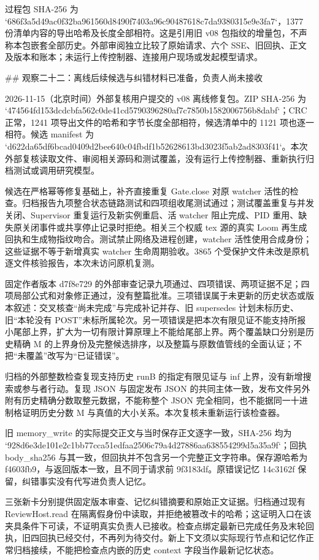 过程包 SHA-256 为 `686f3a5d49ac0f32ba961560d8490f7403a96c90487618c7da9380315e9e3fa7`，1377 份清单内容的导出哈希及长度全部相符。这是引用旧 v08 包指纹的增量包，不声称本包嵌套全部历史。外部审阅独立比较了原始请求、六个 SSE、旧回执、正文及版本和账本；未运行上传控制器、连接用户现场或发起模型请求。


## 观察二十二：离线后续候选与纠错材料已准备，负责人尚未接收

2026-11-15（北京时间）外部复核用户提交的 v08 离线修复包。ZIP SHA-256 为 `474564fd153dcdcbfa562c0de41cd5790396280af7c7850b1582006756b8dabf`；CRC 正常，1241 项导出文件的哈希和字节长度全部相符，候选清单中的 1121 项也逐一相符。候选 manifest 为 `d622da65df6bcad0409d2bee640c04fbdf1b52628613bd3023f5ab2ad8303f41`。本次外部复核读取文件、审阅相关源码和测试覆盖，没有运行上传控制器、重新执行归档测试或调用研究模型。

候选在严格幂等修复基础上，补齐直接重复 Gate.close 对原 watcher 活性的检查。归档报告九项整合状态链路测试和四项组收尾测试通过；测试覆盖重复与并发关闭、Supervisor 重复运行及新实例重启、活 watcher 阻止完成、PID 重用、缺失原关闭事件或共享停止记录时拒绝。相关三个权威 tex 源的真实 Loom 再生成回执和生成物指纹吻合。测试禁止网络及进程创建，watcher 活性使用合成身份；这些证据不等于新增真实 watcher 生命周期验收。3865 个受保护文件未改是原机逐文件核验报告，本次未访问原机复测。

固定作者版本 d7f8e729 的外部审查记录九项通过、四项错误、两项证据不足；四项局部公式和对象修正通过，没有整篇批准。三项错误属于未更新的历史状态或版本叙述：交叉核查“尚未完成”与完成补记并存、旧 supersedes 计划未标历史、旧“本轮没有 POST”未标所属轮次。另一项错误是把本次有限见证不能支持所报小尾部上界，扩大为一切有限计算原理上不能给尾部上界。两个覆盖缺口分别是历史精确 M 的上界身份及完整候选排序，以及整篇与原数值管线的全面认证；不把“未覆盖”改写为“已证错误”。

归档的外部整数检查复现支持历史 runB 的指定有限见证与 inf 上界，没有新增搜索或参与者行动。复现 JSON 与固定发布 JSON 的共同主体一致，发布文件另外附有历史精确分数取整元数据，不能称整个 JSON 完全相同，也不能据同一十进制格证明历史分数 M 与真值的大小关系。本次复核未重新运行该检查器。

旧 memory_write 的实际提交正文与当时保存正文逐字一致，SHA-256 均为 `928d6e3de101e2c1bb77cca51edfaa2506c79a4d27886aa638554299d5a35a9f`；回执 body_sha256 与其一致，但回执并不包含另一个完整正文字符串。保存源哈希为 f4603fb9，与返回版本一致，且不同于请求前 9f3183df。原错误记忆 14c3162f 保留，纠错事实没有代写进负责人记忆。

三张新卡分别提供固定版本审查、记忆纠错摘要和原始正文证据。归档通过现有 ReviewHost.read 在隔离假身份中读取，并拒绝被篡改卡的哈希；这证明入口在该夹具条件下可读，不证明真实负责人已接收。检查点绑定最新已完成任务及末轮回执，旧四回执已经交付，不再列为待交付。新上下文须以实际现行节点和记忆作正常归档接续，不能把检查点内嵌的历史 context 字段当作最新记忆状态。

